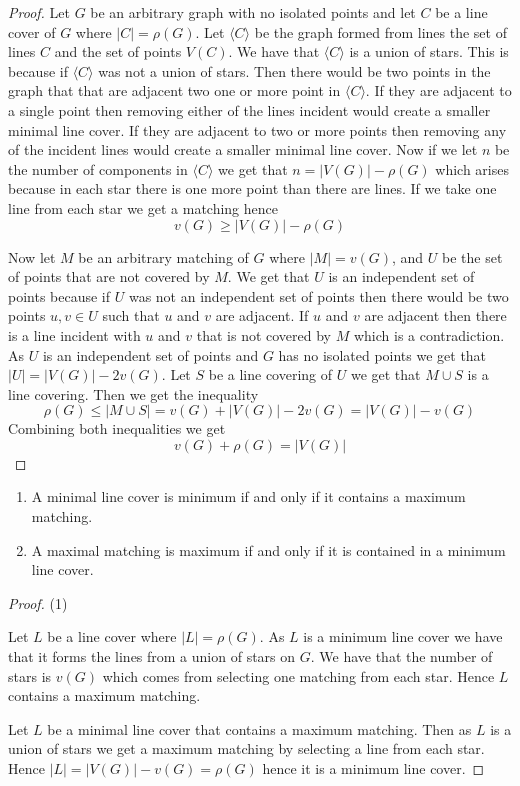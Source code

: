 \documentclass[12pt]{article}
\newenvironment{exercise}[2][Exercise]{\begin{trivlist}
\item[\hskip \labelsep {\bfseries #1}\hskip \labelsep {\bfseries #2.}]}{\end{trivlist}}
\begin{document}
\begin{proof}
    Let $G$ be an arbitrary graph with no isolated points and let $C$ be a line cover of $G$ where $|C|=\rho(G)$. Let $\langle C \rangle$ be the graph formed from lines the set of lines $C$ and the set of points $V(C)$. We have that $\langle C \rangle$ is a union of stars. This is because if $\langle C \rangle$ was not a union of stars. Then there would be two points in the graph that that are adjacent two one or more point in $\langle C \rangle$. If they are adjacent to a single point then removing either of the lines incident would create a smaller minimal line cover. If they are adjacent to two or more points then removing any of the incident lines would create a smaller minimal line cover.
    Now if we let $n$ be the number of components in $\langle C \rangle$ we get that $n=|V(G)|-\rho(G)$ which arises because in each star there is one more point than there are lines. If we take one line from each star we get a matching hence $$v(G)\geq |V(G)| - \rho(G)$$

    Now let $M$ be an arbitrary matching of $G$ where $|M|=v(G)$, and $U$ be the set of points that are not covered by $M$. We get that $U$ is an independent set of points because if $U$ was not an independent set of points then there would be two points $u,v \in U$ such that $u$ and $v$ are adjacent. If $u$ and $v$ are adjacent then there is a line incident with $u$ and $v$ that is not covered by $M$ which is a contradiction. As $U$ is an independent set of points and $G$ has no isolated points we get that $|U| = |V(G)|-2v(G)$. Let $S$ be a line covering of $U$ we get that $M\cup S$ is a line covering. Then we get the inequality $$\rho (G)\leq |M \cup S|= v(G)+|V(G)|-2v(G)=|V(G)|-v(G)$$ Combining both inequalities we get $$v(G)+\rho(G)=|V(G)|$$
\end{proof}


\begin{exercise}{1.0.3}
    \text{\\}

    \begin{enumerate}
        \item A minimal line cover is minimum if and only if it contains a maximum matching.
        \item A maximal matching is maximum if and only if it is contained in a minimum line cover.
    \end{enumerate}
\end{exercise}

\begin{proof}{(1)}

    Let $L$ be a line cover where $|L|=\rho(G)$. As $L$ is a minimum line cover
    we have that it forms the lines from a union of stars on $G$. We have that the number of stars is $v(G)$ which comes from selecting one matching from each star. Hence $L$ contains a maximum matching.

    Let $L$ be a minimal line cover that contains a maximum matching. Then as $L$ is a union of stars we get a maximum matching by selecting a line from each star. Hence $|L|=|V(G)|-v(G)=\rho(G)$ hence it is a minimum line cover.
\end{proof}
\end{document}
